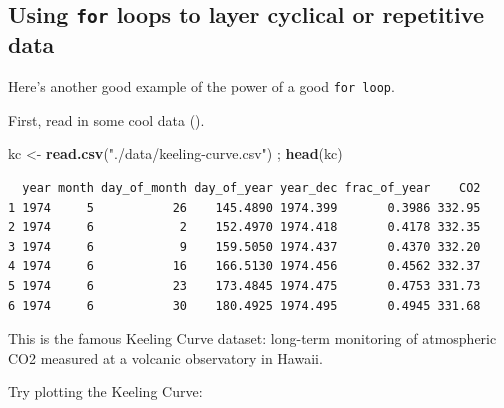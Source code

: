 \documentclass[
]{book}
\newenvironment{Shaded}{\begin{snugshade}}{\end{snugshade}}
\newcommand{\DataTypeTok}[1]{\textcolor[rgb]{0.13,0.29,0.53}{#1}}
\newcommand{\KeywordTok}[1]{\textcolor[rgb]{0.13,0.29,0.53}{\textbf{#1}}}
\newcommand{\NormalTok}[1]{#1}
\newcommand{\OperatorTok}[1]{\textcolor[rgb]{0.81,0.36,0.00}{\textbf{#1}}}
\newcommand{\StringTok}[1]{\textcolor[rgb]{0.31,0.60,0.02}{#1}}
\begin{document}
\hypertarget{using-for-loops-to-layer-cyclical-or-repetitive-data}{%
\subsection*{\texorpdfstring{Using \texttt{for} loops to layer cyclical or repetitive data}{Using for loops to layer cyclical or repetitive data}}\label{using-for-loops-to-layer-cyclical-or-repetitive-data}}

Here's another good example of the power of a good \texttt{for\ loop}.

First, read in some cool data ().

\begin{Shaded}
\begin{Highlighting}[]
\NormalTok{kc <-}\StringTok{ }\KeywordTok{read.csv}\NormalTok{(}\StringTok{"./data/keeling-curve.csv"}\NormalTok{) ; }\KeywordTok{head}\NormalTok{(kc)}
\end{Highlighting}
\end{Shaded}

\begin{verbatim}
  year month day_of_month day_of_year year_dec frac_of_year    CO2
1 1974     5           26    145.4890 1974.399       0.3986 332.95
2 1974     6            2    152.4970 1974.418       0.4178 332.35
3 1974     6            9    159.5050 1974.437       0.4370 332.20
4 1974     6           16    166.5130 1974.456       0.4562 332.37
5 1974     6           23    173.4845 1974.475       0.4753 331.73
6 1974     6           30    180.4925 1974.495       0.4945 331.68
\end{verbatim}

This is the famous Keeling Curve dataset: long-term monitoring of atmospheric CO2 measured at a volcanic observatory in Hawaii.

Try plotting the Keeling Curve:

\begin{Shaded}
\end{Shaded}
\end{document}
